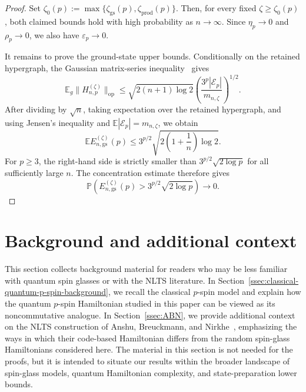 \documentclass[12pt]{article}
\newcommand{\E}{\mathbb{E}}
\renewcommand{\P}{\mathbb{P}}
\newcommand{\mcE}{\mathcal{E}}
\begin{document}
\begin{appendix}
\begin{proof}
Set $\zeta_0(p)
    :=
    \max\{
        \zeta_{\mathrm{gs}}(p),
        \zeta_{\mathrm{prod}}(p)
    \}$.
Then, for every fixed \(\zeta\ge\zeta_0(p)\), both claimed bounds hold
with high probability as \(n\to\infty\). Since
\(\eta_p\to0\) and \(\rho_p\to0\), we also have
\(\varepsilon_p\to0\).

It remains to prove the ground-state upper bounds. Conditionally on the
retained hypergraph, the Gaussian matrix-series
inequality~\cite[Theorem~1.2]{tropp2012User} gives
\[
    \E_g\|H_{n,p}^{(\zeta)}\|_{\mathrm{op}}
    \le
    \sqrt{2(n+1)\log2}
    \left(
        \frac{3^p|\mcE_p|}{m_{n,\zeta}}
    \right)^{1/2}.
\]
After dividing by \(\sqrt n\), taking expectation over the retained
hypergraph, and using Jensen's inequality and
\(\E|\mcE_p|=m_{n,\zeta}\), we obtain
\[
    \E E_{n,\mathrm{gs}}^{(\zeta)}(p)
    \le
    3^{p/2}
    \sqrt{2\left(1+\frac1n\right)\log2}.
\]
For \(p\ge3\), the right-hand side is strictly smaller than
\(3^{p/2}\sqrt{2\log p}\) for all sufficiently large \(n\). The
concentration estimate therefore gives
\[
    \P(
        E_{n,\mathrm{gs}}^{(\zeta)}(p)
        >
        3^{p/2}\sqrt{2\log p}
    )
    \to0.
\]
\end{proof}

\section{Background and additional context}
\label{sec:background}

This section collects background material for readers who may be less familiar with quantum spin glasses or with the NLTS literature. In Section~\ref{ssec:classical-quantum-p-spin-background}, we recall the classical \(p\)-spin model and explain how the quantum \(p\)-spin Hamiltonian studied in this paper can be viewed as its noncommutative analogue. In Section~\ref{ssec:ABN}, we provide additional context on the NLTS construction of Anshu, Breuckmann, and Nirkhe~\cite{anshu2023nlts}, emphasizing the ways in which
their code-based Hamiltonian differs from the random spin-glass Hamiltonians considered here. The material in this section is not needed for the proofs, but it is intended to situate our results within the broader landscape of spin-glass models, quantum Hamiltonian complexity, and state-preparation lower
bounds.


\end{appendix}
\end{document}

